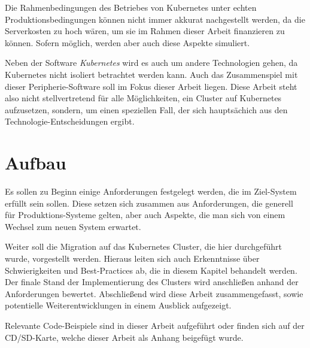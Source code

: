 Die Rahmenbedingungen des Betriebes von Kubernetes unter echten
Produktionsbedingungen k\"onnen nicht immer akkurat nachgestellt werden,
da die Serverkosten zu hoch wären, um sie
im Rahmen dieser Arbeit finanzieren zu können.
Sofern möglich, werden aber auch diese Aspekte simuliert.

Neben der Software \emph{Kubernetes} wird es auch um andere Technologien gehen,
da Kubernetes nicht isoliert betrachtet werden kann. Auch das Zusammenspiel
mit dieser Peripherie-Software soll im Fokus dieser Arbeit liegen.
Diese Arbeit steht also nicht stellvertretend für alle Möglichkeiten,
ein Cluster auf Kubernetes aufzusetzen, sondern, um einen speziellen Fall, der
sich haupts\"achich aus den Technologie-Entscheidungen ergibt.

\section{Aufbau}

Es sollen zu Beginn einige Anforderungen festgelegt werden, die im Ziel-System
erfüllt sein sollen. Diese setzen sich zusammen aus Anforderungen, die generell für
Produktions-Systeme gelten, aber auch Aspekte, die man sich von einem Wechsel zum neuen
System erwartet.

Weiter soll die Migration auf das Kubernetes Cluster,
die hier durchgeführt wurde, vorgestellt werden. Hieraus leiten sich auch
Erkenntnisse über Schwierigkeiten und Best-Practices ab, die in diesem Kapitel
behandelt werden.
Der finale Stand der Implementierung des Clusters
wird anschließen anhand der Anforderungen bewertet.
Abschließend wird diese Arbeit zusammengefasst,
sowie potentielle Weiterentwicklungen in einem Ausblick aufgezeigt.

Relevante Code-Beispiele sind in dieser Arbeit aufgef\"uhrt oder finden sich
auf der CD/SD-Karte, welche dieser Arbeit als Anhang beigef\"ugt wurde.
